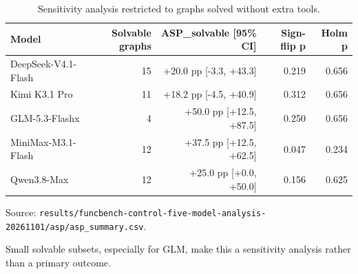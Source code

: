 \begin{table}[htbp]
\centering
\caption{Sensitivity analysis restricted to graphs solved without extra tools.}
\label{tab:aspsolvable}
\footnotesize
\setlength{\tabcolsep}{3pt}
\renewcommand{\arraystretch}{1.08}
\begin{tabularx}{\textwidth}{>{\raggedright\arraybackslash}Xrrrr}
\toprule
Model & Solvable graphs & ASP\_solvable [95\% CI] & Sign-flip p & Holm p \\
\midrule
DeepSeek-V4.1-Flash & 15 & +20.0 pp [-3.3, +43.3] & 0.219 & 0.656 \\
Kimi K3.1 Pro & 11 & +18.2 pp [-4.5, +40.9] & 0.312 & 0.656 \\
GLM-5.3-Flashx & 4 & +50.0 pp [+12.5, +87.5] & 0.250 & 0.656 \\
MiniMax-M3.1-Flash & 12 & +37.5 pp [+12.5, +62.5] & 0.047 & 0.234 \\
Qwen3.8-Max & 12 & +25.0 pp [+0.0, +50.0] & 0.156 & 0.625 \\
\bottomrule
\end{tabularx}
\par\parbox{\linewidth}{\raggedright\footnotesize Source: \texttt{results/\allowbreak{}funcbench-control-five-model-analysis-20261101/\allowbreak{}asp/\allowbreak{}asp\_summary.csv}.}
\par\parbox{\linewidth}{\raggedright\footnotesize Small solvable subsets, especially for GLM, make this a sensitivity analysis rather than a primary outcome.}
\end{table}
